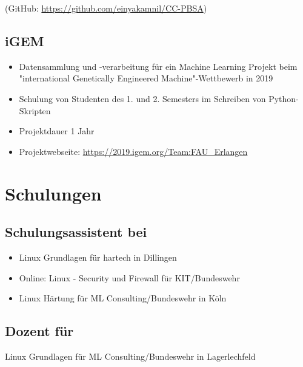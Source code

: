 \documentclass{article}
\begin{document}
(GitHub: \href{https://github.com/einyakamnil/CC-PBSA}{https://github.com/einyakamnil/CC-PBSA})

\subsection{iGEM}

\begin{itemize}
\item Datensammlung und -verarbeitung für ein Machine Learning Projekt beim "international Genetically Engineered Machine"-Wettbewerb in 2019
\item Schulung von Studenten des 1. und 2. Semesters im Schreiben von Python-Skripten
\item Projektdauer 1 Jahr
\item Projektwebseite: \href{https://2019.igem.org/Team:FAU_Erlangen}{https://2019.igem.org/Team:FAU\_Erlangen}
\end{itemize}

\section{Schulungen}

\subsection{Schulungsassistent bei}

\begin{itemize}
\item Linux Grundlagen für hartech in Dillingen
\item Online: Linux - Security und Firewall für KIT/Bundeswehr
\item Linux Härtung für ML Consulting/Bundeswehr in Köln
\end{itemize}

\subsection{Dozent für}

Linux Grundlagen für ML Consulting/Bundeswehr in Lagerlechfeld
\end{document}
